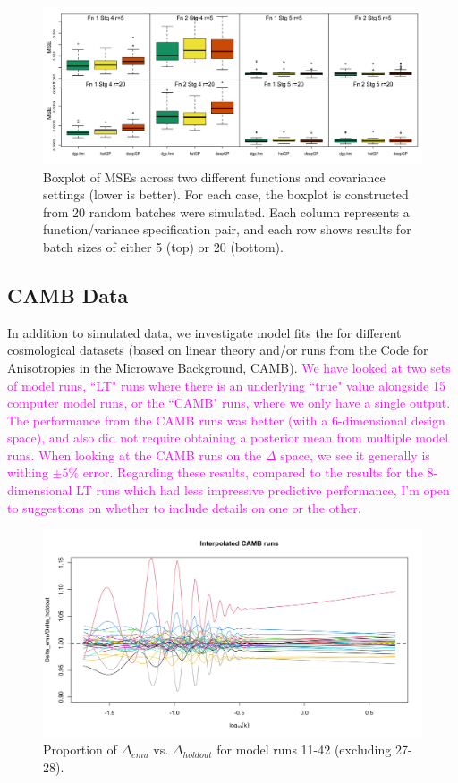 \documentclass[11pt]{article}
\begin{document}
\begin{figure}
    \centering
    \includegraphics[width=6in]{sims_MSE.png}
    \caption{Boxplot of MSEs across two different functions and covariance settings (lower is better). For each case, the boxplot is constructed from 20 random batches were simulated. Each column represents a function/variance specification pair, and each row shows results for batch sizes of either 5 (top) or 20 (bottom).}    
    \label{fig:sims_MSE}
\end{figure}

\subsection{CAMB Data}
\label{subsec:camb}

In addition to simulated data, we investigate model fits the for different cosmological datasets (based on linear theory and/or runs from the Code for Anisotropies in the Microwave Background, CAMB). \textcolor{magenta}{We have looked at two sets of model runs, ``LT" runs where there is an underlying ``true" value alongside 15 computer model runs, or the ``CAMB" runs, where we only have a single output. The performance from the CAMB runs was better (with a 6-dimensional design space), and also did not require obtaining a posterior mean from multiple model runs. When looking at the CAMB runs on the $\Delta$ space, we see it generally is withing $\pm 5\%$ error. Regarding these results, compared to the results for the 8-dimensional LT runs which had less impressive predictive performance, I'm open to suggestions on whether to include details on one or the other.}

\begin{figure}
    \centering
    \includegraphics[width=6in]{plot_pca_CAMB.png}
    \caption{Proportion of $\Delta_{emu}$ vs. $\Delta_{holdout}$ for model runs 11-42 (excluding 27-28).}   
    \label{fig:pca_camb}
\end{figure}
\end{document}
